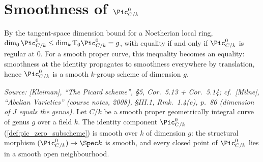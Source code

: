 \section{Smoothness of \(\Pic^0_{C/k}\)}
\label{sec:pic0_smooth}

By the tangent-space dimension bound for a Noetherian local ring,
\(\dim_0 \Pic^0_{C/k} \le \dim_k \tu T_0 \Pic^0_{C/k} = g\), with
equality if and only if \(\Pic^0_{C/k}\) is regular at \(0\). For a
smooth proper curve, this inequality becomes an equality: smoothness
at the identity propagates to smoothness everywhere by
translation, hence \(\Pic^0_{C/k}\) is a smooth \(k\)-group scheme of
dimension \(g\).

\begin{theorem}
  \label{thm:pic0_smooth}

  \textit{Source: [Kleiman], ``The Picard scheme'', \S 5,
  Cor.~5.13 + Cor.~5.14; cf.\ [Milne], ``Abelian Varieties''
  (course notes, 2008), \S III.1, Rmk.~1.4(e), p.~86 (dimension of \(J\)
  equals the genus).}
  Let \(C/k\) be a smooth proper geometrically integral curve of genus
  \(g\) over a field \(k\). The identity component \(\Pic^0_{C/k}\)
  (\cref{def:pic_zero_subscheme}) is smooth over \(k\) of dimension
  \(g\): the structural morphism
  \((\Pic^0_{C/k}) \to \Spec k\) is smooth, and every closed point of
  \(\Pic^0_{C/k}\) lies in a smooth open neighbourhood.
\end{theorem}


